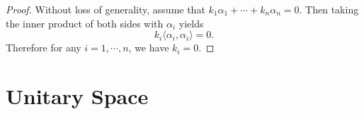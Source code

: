 \begin{proof}
  Without loss of generality,
  assume that $k_1 \alpha_1 + \cdots + k_n\alpha_n = 0$.
  Then taking the inner product of both sides with $\alpha_i$ yields
  \begin{equation}
    k_i \langle \alpha_i, \alpha_i \rangle = 0.
  \end{equation}
  Therefore for any $i = 1,\cdots,n$, we have $k_i = 0$.
\end{proof}




\section{Unitary Space}









